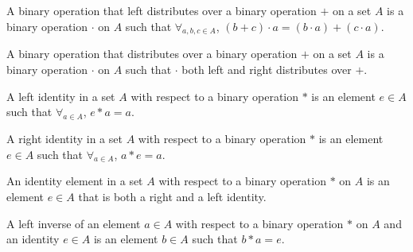 \documentclass[crop=false,class=book,oneside]{standalone}
\begin{document}
            \begin{definition}
                \label{%
                    Definition:MathEnc:Analysis:%
                    Sum:LeftDistribute%
                }
                A binary operation that left distributes
                over a binary operation $+$ on
                a set $A$ is a binary operation $\cdot$ on $A$
                such that $\forall_{a,b,c\in A}$,
                $(b+c)\cdot a=(b\cdot a)+(c\cdot a)$.
            \end{definition}
            \begin{definition}
                \label{Definition:MathEnc:Analysis:Sum:Distribute}
                A binary operation that distributes over a binary
                operation $+$ on a set $A$ is a binary operation
                $\cdot$ on $A$ such that $\cdot$ both left and right
                distributes over $+$.
            \end{definition}
            \begin{definition}
                \label{Definition:MathEnc:Analysis:Sum:LeftIdentity}
                A left identity in a set $A$ with respect
                to a binary operation $*$ is
                an element $e\in A$ such that $\forall_{a\in A}$,
                $e*a=a$.
            \end{definition}
            \begin{definition}
                \label{Definition:MathEnc:Analysis:Sum:RightIdentity}
                A right identity in a set $A$ with respect to a
                binary operation $*$ is an element $e\in A$
                such that $\forall_{a\in A}$, $a*e=a$.
            \end{definition}
            \begin{definition}
                \label{%
                    Definition:MathEnc:Analysis:%
                    Sum:IdentityElement%
                }
                An identity element in a set $A$ with
                respect to a binary operation $*$
                on $A$ is an element $e\in A$ that is
                both a right and a left identity.
            \end{definition}
            \begin{definition}
                \label{Definition:MathEnc:Analysis:Sum:LeftInverse}
                A left inverse of an element $a\in A$ with
                respect to a binary operation $*$
                on $A$ and an identity $e\in A$ is an element
                $b\in A$ such that $b*a=e$.
            \end{definition}
\end{document}
